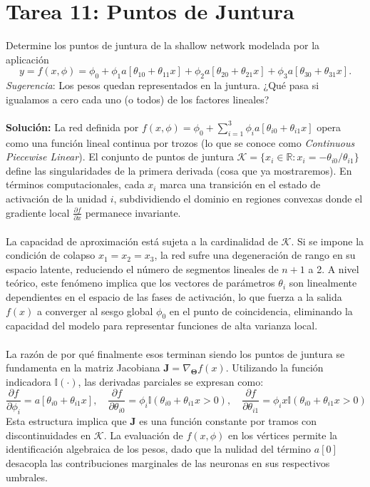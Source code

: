 \documentclass{article}
\begin{document}
\section{Tarea 11: Puntos de Juntura}
\noindent Determine los puntos de juntura de la shallow network modelada por la aplicación \[y = f(x, \phi) = \phi_0 + \phi_1 a[\theta_{10} + \theta_{11}x] + \phi_2 a[\theta_{20} + \theta_{21}x] + \phi_3 a[\theta_{30} + \theta_{31}x].\] \textit{Sugerencia}: Los pesos quedan representados en la juntura. ¿Qué pasa si igualamos a cero cada uno (o todos) de los factores lineales?\\ \\
\textbf{Solución:} La red definida por $f(x, \phi) = \phi_0 + \sum_{i=1}^3 \phi_i a[\theta_{i0} + \theta_{i1}x]$ opera como una función lineal continua por trozos (lo que se conoce como \textit{Continuous Piecewise Linear}). El conjunto de puntos de juntura $\mathcal{K} = \{x_i \in \mathbb{R} : x_i = -\theta_{i0}/\theta_{i1}\}$ define las singularidades de la primera derivada (cosa que ya mostraremos). En términos computacionales, cada $x_i$ marca una transición en el estado de activación de la unidad $i$, subdividiendo el dominio en regiones convexas donde el gradiente local $\frac{\partial f}{\partial x}$ permanece invariante. \\ \\
La capacidad de aproximación está sujeta a la cardinalidad de $\mathcal{K}$. Si se impone la condición de colapso $x_1 = x_2 = x_3$, la red sufre una degeneración de rango en su espacio latente, reduciendo el número de segmentos lineales de $n+1$ a 2. A nivel teórico, este fenómeno implica que los vectores de parámetros $\theta_i$ son linealmente dependientes en el espacio de las fases de activación, lo que fuerza a la salida $f(x)$ a converger al sesgo global $\phi_0$ en el punto de coincidencia, eliminando la capacidad del modelo para representar funciones de alta varianza local. \\ \\
La razón de por qué finalmente esos terminan siendo los puntos de juntura se fundamenta en la matriz Jacobiana $\mathbf{J} = \nabla_{\mathbf{\Theta}} f(x)$. Utilizando la función indicadora $\mathbb{I}(\cdot)$, las derivadas parciales se expresan como:
$$\frac{\partial f}{\partial \phi_i} = a[\theta_{i0} + \theta_{i1}x], \quad \frac{\partial f}{\partial \theta_{i0}} = \phi_i \mathbb{I}(\theta_{i0} + \theta_{i1}x > 0), \quad \frac{\partial f}{\partial \theta_{i1}} = \phi_i x \mathbb{I}(\theta_{i0} + \theta_{i1}x > 0)$$
Esta estructura implica que $\mathbf{J}$ es una función constante por tramos con discontinuidades en $\mathcal{K}$. La evaluación de $f(x, \phi)$ en los vértices permite la identificación algebraica de los pesos, dado que la nulidad del término $a[0]$ desacopla las contribuciones marginales de las neuronas en sus respectivos umbrales. \\ \\
\end{document}
